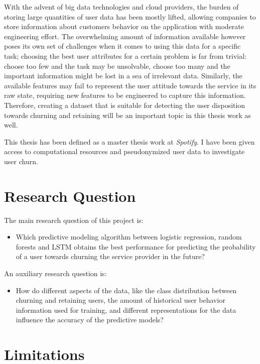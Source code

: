 \documentclass{kththesis}
\begin{document}
	With the advent of big data technologies and cloud providers, the burden of storing large quantities of user data has been mostly lifted, allowing companies to store information about customers behavior on the application with moderate engineering effort. The overwhelming amount of information available however poses its own set of challenges when it comes to using this data for a specific task; choosing the best user attributes for a certain problem is far from trivial: choose too few and the task may be unsolvable, choose too many and the important information might be lost in a sea of irrelevant data. Similarly, the available features may fail to represent the user attitude towards the service in its raw state, requiring  new features to be engineered to capture this information. Therefore, creating a dataset that is suitable for detecting the user disposition towards churning and retaining will be an important topic in this thesis work as well.
	
	This thesis has been defined as a master thesis work at \emph{Spotify}. I have been given access to computational resources and pseudonymized user data to investigate user churn.
      
\section{Research Question}	
	
The main research question of this project is:

\begin{itemize}
\item Which predictive modeling algorithm between logistic regression, random forests and LSTM obtains the best performance for predicting the probability of a user towards churning the service provider in the future?
\end{itemize}	

An auxiliary research question is:

\begin{itemize}
\item How do different aspects of the data, like the class distribution between churning and retaining users, the amount of historical user behavior information used for training, and different representations for the data influence the accuracy of the predictive models?
\end{itemize}

\section{Limitations}
\end{document}
